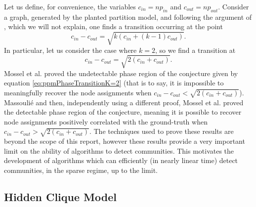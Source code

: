 Let us define, for convenience, the variables $c_{in} = np_{in}$ and $c_{out} = np_{out}$.
Consider a graph, generated by the planted partition model, and following the argument of \cite{NN12}, which we will not explain, one finds a transition occurring at the point
\begin{equation}
\label{eq:ppmPhaseTransitionK}
	c_{in} - c_{out} = \sqrt{k(c_{in} + (k-1)c_{out})}.
\end{equation}
In particular, let us consider the case where $k = 2$, so we find a transition at
\begin{equation}
\label{eq:ppmPhaseTransitionK=2}
	c_{in} - c_{out} = \sqrt{2(c_{in} + c_{out})}.
\end{equation}
Mossel et al. \cite{MNS12} proved the undetectable phase region of the conjecture given by equation \cref{eq:ppmPhaseTransitionK=2} (that is to say, it is impossible to meaningfully recover the node assignments when $ c_{in} - c_{out} < \sqrt{2(c_{in} + c_{out})}$).
Massouli\'e \cite{Mas13} and then, independently using a different proof, Mossel et al. \cite{MNS13b} proved the detectable phase region of the conjecture, meaning it is possible to recover node assignments positively correlated with the ground-truth when $ c_{in} - c_{out} > \sqrt{2(c_{in} + c_{out})}$.
The techniques used to prove these results are beyond the scope of this report, however these results provide a very important limit on the ability of algorithms to detect communities.
This motivates the development of algorithms which can efficiently (in nearly linear time) detect communities, in the sparse regime, up to the limit.


\subsection{Hidden Clique Model}
\label{subsec:hiddenCliqueModel}

